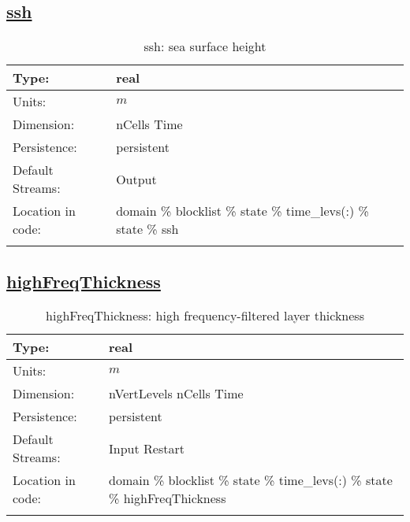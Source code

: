 \subsection[ssh]{\hyperref[sec:var_tab_state]{ssh}}
\label{subsec:var_sec_state_ssh}
\begin{center}
\begin{longtable}{| p{2.0in} | p{4.0in} |}
        \hline 
        Type: & real \\
        \hline 
        Units: & $m$ \\
        \hline 
        Dimension: & nCells Time \\
        \hline 
        Persistence: & persistent \\
        \hline 
		 Default Streams: & Output  \\
        \hline 
		 Location in code: & domain \% blocklist \% state \% time\_levs(:) \% state \% ssh \\
		 \hline 
    \caption{ssh: sea surface height}
\end{longtable}
\end{center}
\subsection[highFreqThickness]{\hyperref[sec:var_tab_state]{highFreqThickness}}
\label{subsec:var_sec_state_highFreqThickness}
\begin{center}
\begin{longtable}{| p{2.0in} | p{4.0in} |}
        \hline 
        Type: & real \\
        \hline 
        Units: & $m$ \\
        \hline 
        Dimension: & nVertLevels nCells Time \\
        \hline 
        Persistence: & persistent \\
        \hline 
		 Default Streams: & Input Restart  \\
        \hline 
		 Location in code: & domain \% blocklist \% state \% time\_levs(:) \% state \% highFreqThickness \\
		 \hline 
    \caption{highFreqThickness: high frequency-filtered layer thickness}
\end{longtable}
\end{center}

